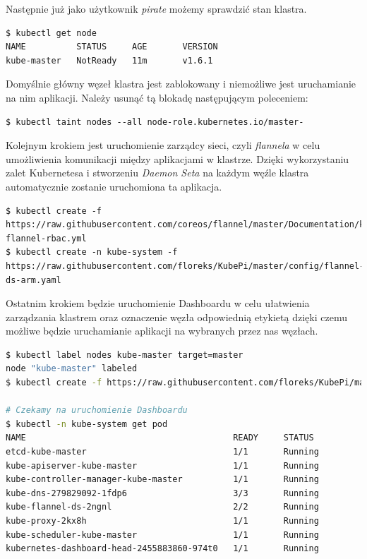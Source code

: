 \documentclass[12pt]{report}
\begin{document}
{Następnie już jako użytkownik \textit{pirate} możemy sprawdzić stan klastra.

\begin{lstlisting}[float,floatplacement=H]
$ kubectl get node
NAME          STATUS     AGE       VERSION
kube-master   NotReady   11m       v1.6.1
\end{lstlisting}

Domyślnie główny węzeł klastra jest zablokowany i niemożliwe jest uruchamianie na nim aplikacji. Należy usunąć tą blokadę następującym poleceniem:

\begin{lstlisting}
$ kubectl taint nodes --all node-role.kubernetes.io/master-
\end{lstlisting}

Kolejnym krokiem jest uruchomienie zarządcy sieci, czyli \textit{flannela} w celu umożliwienia komunikacji między aplikacjami w klastrze. Dzięki wykorzystaniu zalet Kubernetesa i stworzeniu \textit{Daemon Seta} na każdym węźle klastra automatycznie zostanie uruchomiona ta aplikacja.

\begin{lstlisting}
$ kubectl create -f https://raw.githubusercontent.com/coreos/flannel/master/Documentation/kube-flannel-rbac.yml
$ kubectl create -n kube-system -f https://raw.githubusercontent.com/floreks/KubePi/master/config/flannel-ds-arm.yaml
\end{lstlisting}

Ostatnim krokiem będzie uruchomienie Dashboardu w celu ułatwienia zarządzania klastrem oraz oznaczenie węzła odpowiednią etykietą dzięki czemu możliwe będzie uruchamianie aplikacji na wybranych przez nas węzłach. 

\begin{lstlisting}[language=bash]
$ kubectl label nodes kube-master target=master
node "kube-master" labeled
$ kubectl create -f https://raw.githubusercontent.com/floreks/KubePi/master/config/dashboard-arm.yaml

# Czekamy na uruchomienie Dashboardu
$ kubectl -n kube-system get pod
NAME                                         READY     STATUS
etcd-kube-master                             1/1       Running
kube-apiserver-kube-master                   1/1       Running
kube-controller-manager-kube-master          1/1       Running
kube-dns-279829092-1fdp6                     3/3       Running
kube-flannel-ds-2ngnl                        2/2       Running
kube-proxy-2kx8h                             1/1       Running
kube-scheduler-kube-master                   1/1       Running
kubernetes-dashboard-head-2455883860-974t0   1/1       Running


\end{lstlisting}}
\end{document}
